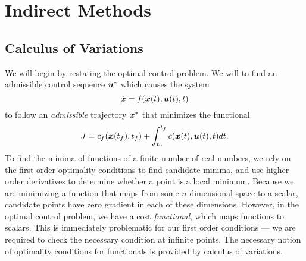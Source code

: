 \chapter{Indirect Methods}

\section{Calculus of Variations}

We will begin by restating the optimal control problem. We will to find an admissible control sequence $\bm{u}^*$ which causes the system 
\begin{equation}
    \dot{\bm{x}} = f(\bm{x}(t),\bm{u}(t),t)
\end{equation}
to follow an \textit{admissible} trajectory $\bm{x}^*$ that minimizes the functional 
\begin{equation}
    J = c_f(\bm{x}(t_f),t_f) + \int_{t_0}^{t_f} c(\bm{x}(t),\bm{u}(t),t) dt.
\end{equation}
To find the minima of functions of a finite number of real numbers, we rely on the first order optimality conditions to find candidate minima, and use higher order derivatives to determine whether a point is a local minimum. Because we are minimizing a function that maps from some $n$ dimensional space to a scalar, candidate points have zero gradient in each of these dimensions. However, in the optimal control problem, we have a cost \textit{functional}, which maps functions to scalars. This is immediately problematic for our first order conditions --- we are required to check the necessary condition at infinite points. The necessary notion of optimality conditions for functionals is provided by calculus of variations.

